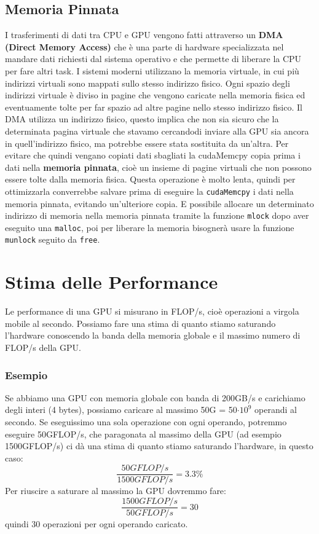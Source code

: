 \documentclass[10pt, letterpaper]{report}
\begin{document}
\subsection{Memoria Pinnata}
I trasferimenti di dati tra CPU e GPU vengono fatti attraverso un \textbf{DMA (Direct Memory
Access)} che è una parte di hardware specializzata nel mandare dati richiesti dal sistema operativo e che permette di liberare la CPU per fare altri task.
I sistemi moderni utilizzano la memoria virtuale, in cui più indirizzi virtuali sono mappati sullo
stesso indirizzo fisico. Ogni spazio degli indirizzi virtuale è diviso in pagine che vengono caricate
nella memoria fisica ed eventuamente tolte per far spazio ad altre pagine nello stesso indirizzo
fisico.\acc 
Il DMA utilizza un indirizzo fisico, questo implica che non sia sicuro che la determinata pagina
virtuale che stavamo cercandodi inviare alla GPU sia ancora in quell'indirizzo fisico, ma potrebbe essere stata sostituita da un'altra. Per evitare che quindi vengano copiati dati sbagliati
la cudaMemcpy copia prima i dati nella \textbf{memoria pinnata}, cioè un insieme di pagine virtuali
che non possono essere tolte dalla memoria fisica. Questa operazione è molto lenta, quindi per
ottimizzarla converrebbe salvare prima di eseguire la \texttt{cudaMemcpy} i dati nella memoria pinnata,
evitando un'ulteriore copia.
E possibile allocare un determinato indirizzo di memoria nella memoria pinnata tramite la 
funzione \texttt{mlock} dopo aver eseguito una \texttt{malloc}, poi per liberare la memoria bisognerà usare la
funzione \texttt{munlock} seguito da \texttt{free}.
\flowerLine
\section{Stima delle Performance}
Le performance di una GPU si misurano in FLOP/s, cioè operazioni a virgola mobile al secondo.
Possiamo fare una stima di quanto stiamo saturando l'hardware conoscendo la banda della
memoria globale e il massimo numero di FLOP/s della GPU.
\subsubsection{Esempio}
Se abbiamo una GPU con memoria globale con banda di 200GB/s e carichiamo degli interi
(4 bytes), possiamo caricare al massimo 50G = 50$\cdot 10^9$ operandi al secondo. Se eseguissimo una sola
operazione con ogni operando, potremmo eseguire 50GFLOP/s, che paragonata al massimo della
GPU (ad esempio 1500GFLOP/s) ci dà una stima di quanto stiamo saturando l'hardware, in
questo caso:
$$ \frac{50GFLOP/s}{1500GFLOP/s}=3.3\%$$
Per riuscire a saturare al massimo la GPU dovremmo fare:
$$ \frac{1500GFLOP/s}{50GFLOP/s}=30$$quindi 30 operazioni per ogni operando caricato.
\end{document}
